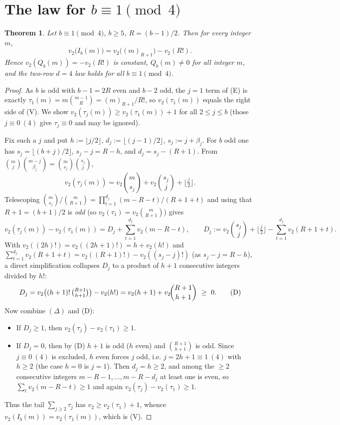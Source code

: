 \documentclass[11pt]{article}
\newtheorem{theorem}{Theorem}
\newcommand{\vv}{v_2}
\begin{document}
\section{The law for $b\equiv1\pmod4$}
\begin{theorem}
Let $b\equiv1\pmod4$, $b\ge5$, $R=(b-1)/2$. Then for every integer $m$,
\[
   \vv\big(I_b(m)\big)=\vv\big((m)_{R+1}\big)-\vv(R!).
   \tag{V}
\]
Hence $\vv(Q_b(m))=-\vv(R!)$ is constant, $Q_b(m)\ne0$ for all integer $m$, and the two-row
$d=4$ law holds for all $b\equiv1\pmod4$.
\end{theorem}
\begin{proof}
As $b$ is odd with $b-1=2R$ even and $b-2$ odd, the $j=1$ term of (E) is exactly
$\tau_1(m)=m\binom{m-1}{R}=(m)_{R+1}/R!$, so $\vv(\tau_1(m))$ equals the right side of (V).
We show $\vv(\tau_j(m))\ge\vv(\tau_1(m))+1$ for all $2\le j\le b$ (those $j\equiv0\ (4)$ give
$\tau_j\equiv0$ and may be ignored).

Fix such a $j$ and put $h:=\lfloor j/2\rfloor$, $d_j:=\lfloor(j-1)/2\rfloor$, $s_j:=j+\beta_j$.
For $b$ odd one has $s_j=\lfloor(b+j)/2\rfloor$, $s_j-j=R-h$, and $d_j=s_j-(R+1)$. From
$\binom{m}{j}\binom{m-j}{\beta_j}=\binom{m}{s_j}\binom{s_j}{j}$,
\[
   \vv(\tau_j(m))=\vv\!\binom{m}{s_j}+\vv\!\binom{s_j}{j}+\Big\lfloor\tfrac j2\Big\rfloor .
\]
Telescoping $\binom{m}{s_j}/\binom{m}{R+1}=\prod_{t=1}^{d_j}(m-R-t)/(R+1+t)$ and using that
$R+1=(b+1)/2$ is \emph{odd} (so $\vv(\tau_1)=\vv\binom{m}{R+1}$) gives
\[
   \vv(\tau_j(m))-\vv(\tau_1(m))=D_j+\sum_{t=1}^{d_j}\vv(m-R-t),\qquad
   D_j:=\vv\!\binom{s_j}{j}+\Big\lfloor\tfrac j2\Big\rfloor-\sum_{t=1}^{d_j}\vv(R+1+t).
   \tag{$\Delta$}
\]
With $\vv((2h)!)=\vv((2h+1)!)=h+\vv(h!)$ and
$\sum_{t=1}^{d_j}\vv(R+1+t)=\vv((R+1)!)-\vv((s_j-j)!)$ (as $s_j-j=R-h$), a direct simplification
collapses $D_j$ to a product of $h+1$ consecutive integers divided by $h!$:
\[
   D_j=\vv\big((h+1)!\,\tbinom{R+1}{h+1}\big)-\vv(h!)=\vv(h+1)+\vv\!\binom{R+1}{h+1}\ \ge\ 0.
   \tag{D}
\]
Now combine $(\Delta)$ and (D):
\begin{itemize}
\item If $D_j\ge1$, then $\vv(\tau_j)-\vv(\tau_1)\ge1$.
\item If $D_j=0$, then by (D) $h+1$ is odd ($h$ even) and $\binom{R+1}{h+1}$ is odd. Since
$j\equiv0\ (4)$ is excluded, $h$ even forces $j$ odd, i.e. $j=2h+1\equiv1\ (4)$ with $h\ge2$
(the case $h=0$ is $j=1$). Then $d_j=h\ge2$, and among the $\ge2$ consecutive integers
$m-R-1,\dots,m-R-d_j$ at least one is even, so $\sum_{t}\vv(m-R-t)\ge1$ and again
$\vv(\tau_j)-\vv(\tau_1)\ge1$.
\end{itemize}
Thus the tail $\sum_{j\ge2}\tau_j$ has $\vv\ge\vv(\tau_1)+1$, whence
$\vv(I_b(m))=\vv(\tau_1(m))$, which is (V).
\end{proof}
\end{document}
